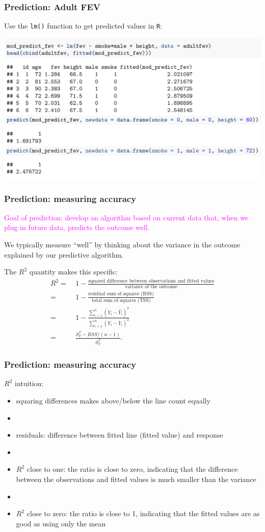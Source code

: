 \documentclass[12pt, 
hyperref={colorlinks=true, linkcolor=blue, urlcolor=cyan},dvipsnames]{beamer}
\begin{document}
\begin{frame}
\frametitle{Prediction: Adult FEV}
Use the \texttt{lm()} function to get predicted values in \texttt{R}:
\begin{center}
\includegraphics[width = 1\textwidth]{plots/predict_adult_fev_vals.png}
\end{center}
\end{frame}

\begin{frame}
\frametitle{Prediction: measuring accuracy}
\textcolor{magenta}{Goal of prediction: develop an algorithm based on current data that, when we plug in future data, predicts the outcome well.}

We typically measure ``well'' by thinking about the variance in the outcome explained by our predictive algorithm. 

The $R^2$ quantity makes this specific:
\begin{align*}
R^2 = & \ 1 - \frac{\text{squared difference between observations and fitted values}}{\text{variance of the outcome}} \\
= & \ 1 - \frac{\text{residual sum of squares (RSS)}}{\text{total sum of squares (TSS)}} \\
= & \ 1 - \frac{\sum_{i=1}^n (Y_i - \widehat{Y}_i)^2}{\sum_{i=1}^n (Y_i - \overline{Y}_i)^2} \\
=& \ \frac{\hat{\sigma}^2_Y - RSS/(n-1)}{\hat{\sigma}^2_Y}.
\end{align*}
\end{frame}

\begin{frame}
\frametitle{Prediction: measuring accuracy}
$R^2$ intuition:
\begin{itemize}
\item squaring differences makes above/below the line count equally
\item[]
\item residuals: difference between fitted line (fitted value) and response
\item[]
\item $R^2$ close to one: the ratio is close to zero, indicating that the difference between the observations and fitted values is much smaller than the variance
\item[]
\item $R^2$ close to zero: the ratio is close to 1, indicating that the fitted values are as good as using only the mean
\end{itemize}
\end{frame}
\end{document}
